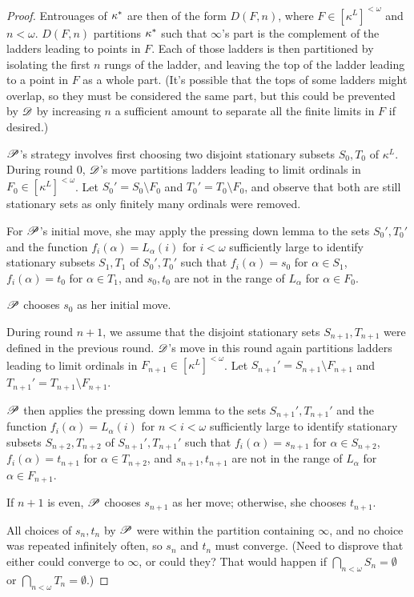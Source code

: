 \begin{proof}
  Entrouages of $\kappa^*$ are then of the form $D(F,n)$, where
  $F\in[\kappa^L]^{<\omega}$ and $n<\omega$. $D(F,n)$ partitions
  $\kappa^*$ such that $\infty$'s part is the complement of the 
  ladders leading to points in $F$. Each of those ladders is then partitioned
  by isolating the first $n$ rungs of the ladder, and leaving the top of the
  ladder leading to a point in $F$ as a whole part. (It's possible that
  the tops of some ladders might overlap, so they must be considered
  the same part, but this could be prevented by $\mathscr{D}$ by increasing $n$
  a sufficient amount to separate all the finite limits in $F$ if desired.)
  
  $\mathscr{P}$'s strategy involves first choosing two disjoint stationary subsets
  $S_0,T_0$ of $\kappa^L$. During round $0$, $\mathscr{D}$'s move partitions ladders
  leading to limit ordinals in
  $F_0\in[\kappa^L]^{<\omega}$. Let $S_0'=S_0\setminus F_0$ and 
  $T_0'=T_0\setminus F_0$, and observe that both are still stationary sets as 
  only finitely many ordinals were removed.
  
  For $\mathscr{P}$'s initial move, she may apply the pressing down lemma to the
  sets $S_0',T_0'$ and the function $f_i(\alpha)=L_\alpha(i)$ for $i<\omega$
  sufficiently large to identify 
  stationary
  subsets $S_1,T_1$ of $S_0',T_0'$ such that $f_i(\alpha)=s_0$ for 
  $\alpha\in S_1$, $f_i(\alpha)=t_0$ for $\alpha\in T_1$, and
  $s_0,t_0$ are not in the range of $L_\alpha$ for $\alpha\in F_0$. 
  
  $\mathscr{P}$ chooses $s_0$ as her initial move.
  
  During round $n+1$, we assume that the disjoint stationary sets 
  $S_{n+1},T_{n+1}$ were defined in the previous round. 
  $\mathscr{D}$'s move in this round again partitions ladders
  leading to limit ordinals in
  $F_{n+1}\in[\kappa^L]^{<\omega}$. Let $S_{n+1}'=S_{n+1}\setminus F_{n+1}$ 
  and $T_{n+1}'=T_{n+1}\setminus F_{n+1}$.
  
  $\mathscr{P}$ then applies the pressing down lemma to the
  sets $S_{n+1}',T_{n+1}'$ and the function 
  $f_i(\alpha)=L_\alpha(i)$ for $n<i<\omega$
  sufficiently large to identify 
  stationary
  subsets $S_{n+2},T_{n+2}$ of $S_{n+1}',T_{n+1}'$ such that 
  $f_i(\alpha)=s_{n+1}$ for 
  $\alpha\in S_{n+2}$, $f_i(\alpha)=t_{n+1}$ for $\alpha\in T_{n+2}$, and
  $s_{n+1},t_{n+1}$ are not in the range of $L_\alpha$ for 
  $\alpha\in F_{n+1}$.
  
  If $n+1$ is even, $\mathscr{P}$ chooses $s_{n+1}$ as her move; otherwise, she
  chooses $t_{n+1}$.
  
  All choices of $s_n,t_n$ by $\mathscr{P}$ were within the partition containing 
  $\infty$, and no choice was repeated infinitely often, so $s_n$ and $t_n$
  must converge. (Need to disprove that either could converge to $\infty$, or
  could they? That would happen if $\bigcap_{n<\omega} S_n =\emptyset$ or
  $\bigcap_{n<\omega} T_n =\emptyset$.)
  
\end{proof}










